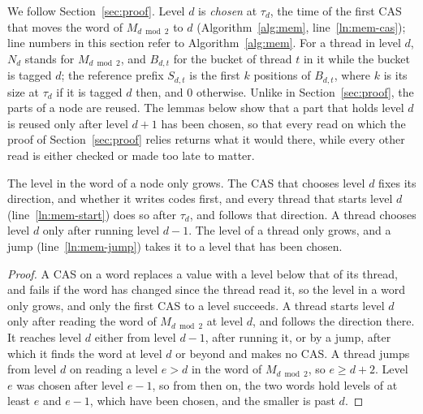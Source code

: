 We follow Section~\ref{sec:proof}. Level $d$ is \emph{chosen} at $\tau_d$, the time of the first CAS that moves the word of $M_{d \bmod 2}$ to $d$ (Algorithm~\ref{alg:mem}, line~\ref{ln:mem-cas}); line numbers in this section refer to Algorithm~\ref{alg:mem}. For a thread in level $d$, $N_d$ stands for $M_{d \bmod 2}$, and $B_{d,t}$ for the bucket of thread $t$ in it while the bucket is tagged $d$; the reference prefix $S_{d,t}$ is the first $k$ positions of $B_{d,t}$, where $k$ is its size at $\tau_d$ if it is tagged $d$ then, and $0$ otherwise. Unlike in Section~\ref{sec:proof}, the parts of a node are reused. The lemmas below show that a part that holds level $d$ is reused only after level $d+1$ has been chosen, so that every read on which the proof of Section~\ref{sec:proof} relies returns what it would there, while every other read is either checked or made too late to matter.

\begin{lemma}[Words]
\label{lem:mem-words}
The level in the word of a node only grows. The CAS that chooses level $d$ fixes its direction, and whether it writes codes first, and every thread that starts level $d$ (line~\ref{ln:mem-start}) does so after $\tau_d$, and follows that direction. A thread chooses level $d$ only after running level $d-1$. The level of a thread only grows, and a jump (line~\ref{ln:mem-jump}) takes it to a level that has been chosen.
\end{lemma}
\begin{proof}
A CAS on a word replaces a value with a level below that of its thread, and fails if the word has changed since the thread read it, so the level in a word only grows, and only the first CAS to a level succeeds. A thread starts level $d$ only after reading the word of $M_{d \bmod 2}$ at level $d$, and follows the direction there. It reaches level $d$ either from level $d-1$, after running it, or by a jump, after which it finds the word at level $d$ or beyond and makes no CAS. A thread jumps from level $d$ on reading a level $e > d$ in the word of $M_{d \bmod 2}$, so $e \geq d+2$. Level $e$ was chosen after level $e-1$, so from then on, the two words hold levels of at least $e$ and $e-1$, which have been chosen, and the smaller is past $d$.
\end{proof}


